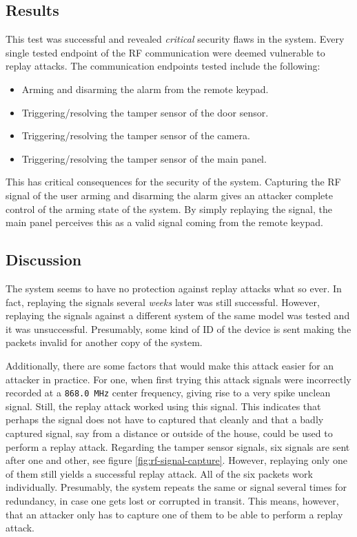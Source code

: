 \subsection{Results}
This test was successful and revealed \textit{critical} security flaws in the system. Every single tested endpoint of the RF communication were deemed vulnerable to replay attacks. The communication endpoints tested include the following:
\begin{itemize}
    \item Arming and disarming the alarm from the remote keypad.
    \item Triggering/resolving the tamper sensor of the door sensor.
    \item Triggering/resolving the tamper sensor of the camera.
    \item Triggering/resolving the tamper sensor of the main panel.
\end{itemize}
This has critical consequences for the security of the system. Capturing the RF signal of the user arming and disarming the alarm gives an attacker complete control of the arming state of the system. By simply replaying the signal, the main panel perceives this as a valid signal coming from the remote keypad.

\subsection{Discussion}
The system seems to have no protection against replay attacks what so ever. In fact, replaying the signals several \textit{weeks} later was still successful. However, replaying the signals against a different system of the same model was tested and it was unsuccessful. Presumably, some kind of ID of the device is sent making the packets invalid for another copy of the system.

Additionally, there are some factors that would make this attack easier for an attacker in practice. For one, when first trying this attack signals were incorrectly recorded at a \texttt{868.0 MHz} center frequency, giving rise to a very spike unclean signal. Still, the replay attack worked using this signal. This indicates that perhaps the signal does not have to captured that cleanly and that a badly captured signal, say from a distance or outside of the house, could be used to perform a replay attack. Regarding the tamper sensor signals, six signals are sent after one and other, see figure \ref{fig:rf-signal-capture}. However, replaying only one of them still yields a successful replay attack. All of the six packets work individually. Presumably, the system repeats the same or signal several times for redundancy, in case one gets lost or corrupted in transit. This means, however, that an attacker only has to capture one of them to be able to perform a replay attack.

